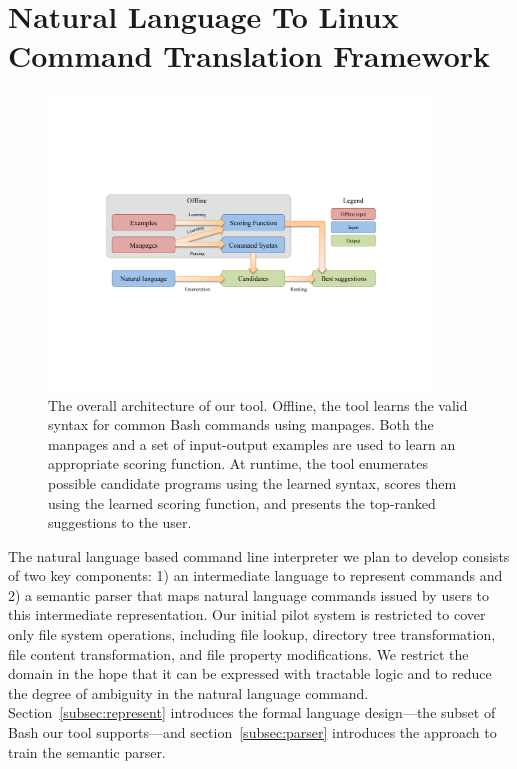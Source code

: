 \section{Natural Language To Linux Command Translation Framework}
\label{sec:framework}

\begin{figure}[h]
    \begin{center} \includegraphics[width=4in]{architecture.pdf} \end{center}
    \caption{The overall architecture of our tool. Offline, the tool learns the
        valid syntax for common Bash commands using manpages. Both the manpages
        and a set of input-output examples are used to learn an appropriate
        scoring function. At runtime, the tool enumerates possible candidate
        programs using the learned syntax, scores them using the learned scoring
        function, and presents the top-ranked suggestions to the user.}
    \label{fig:arch}
\end{figure}

The natural language based command line interpreter we plan to develop consists of two key components: 1) an intermediate language to represent commands and
2) a semantic parser that maps natural language commands issued by users to this intermediate representation. Our initial pilot system is restricted to cover only file system operations, including file lookup, directory tree transformation, file content transformation, and file property modifications. We restrict the domain in the hope that it can be expressed with tractable logic and to reduce the degree of ambiguity in the natural language command. Section~\ref{subsec:represent} introduces the formal language design---the subset of Bash our tool supports---and section~\ref{subsec:parser} introduces the approach to train the semantic parser.



